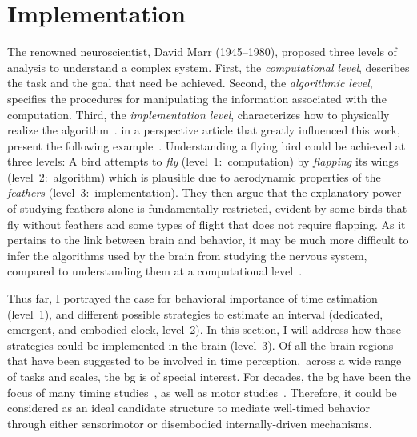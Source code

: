 \section{Implementation}
\label{ch:intro:implementation}

The renowned neuroscientist, David Marr (1945--1980), proposed three levels of analysis to understand a complex system.
First, the \emph{computational level}\!{}, describes the task and the goal that need be achieved.
Second, the \emph{algorithmic level}\!{}, specifies the procedures for manipulating the information associated with the computation.
Third, the \emph{implementation level}\!{}, characterizes how to physically realize the algorithm~\cite{Willshaw2015Marr}.
 in a perspective article that greatly influenced this work, present the following example~\cite{Krakauer2017Neuron}.
Understanding a flying bird could be achieved at three levels:
A bird attempts to \textit{fly} (level~1:~computation) by \textit{flapping} its wings (level~2:~algorithm) which is plausible due to aerodynamic properties of the \textit{feathers} (level~3:~implementation).
They then argue that the explanatory power of studying feathers alone is fundamentally restricted, evident by some birds that fly without feathers and some types of flight that does not require flapping.
As it pertains to the link between brain and behavior, it may be much more difficult to infer the algorithms used by the brain from studying the nervous system, compared to understanding them at a computational level~\cite[see also][]{Jonas2017}.
\par
Thus far, I portrayed the case for behavioral importance of time estimation (level~1), and different possible strategies to estimate an interval (dedicated, emergent, and embodied clock, level~2).
In this section, I will address how those strategies could be implemented in the brain (level~3).
Of all the brain regions that have been suggested to be involved in time perception,\footnotemark\ across a wide range of tasks and scales, the \gls{bg} is of special interest.
For decades, the \gls{bg} have been the focus of many timing studies~\cite[see][]{Paton2018NeuronRev}, as well as motor studies~\cite[see][]{Turner2010CurrOpinNeurobiol}.
Therefore, it could be considered as an ideal candidate structure to mediate well-timed behavior through either sensorimotor or disembodied internally-driven mechanisms.

